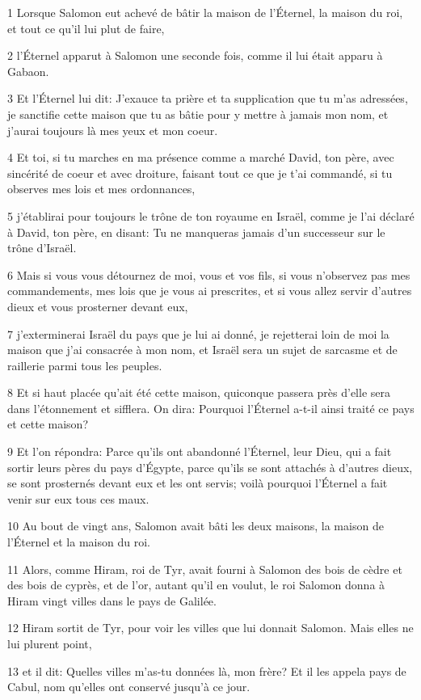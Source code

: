 \par 1 Lorsque Salomon eut achevé de bâtir la maison de l'Éternel, la maison du roi, et tout ce qu'il lui plut de faire,
\par 2 l'Éternel apparut à Salomon une seconde fois, comme il lui était apparu à Gabaon.
\par 3 Et l'Éternel lui dit: J'exauce ta prière et ta supplication que tu m'as adressées, je sanctifie cette maison que tu as bâtie pour y mettre à jamais mon nom, et j'aurai toujours là mes yeux et mon coeur.
\par 4 Et toi, si tu marches en ma présence comme a marché David, ton père, avec sincérité de coeur et avec droiture, faisant tout ce que je t'ai commandé, si tu observes mes lois et mes ordonnances,
\par 5 j'établirai pour toujours le trône de ton royaume en Israël, comme je l'ai déclaré à David, ton père, en disant: Tu ne manqueras jamais d'un successeur sur le trône d'Israël.
\par 6 Mais si vous vous détournez de moi, vous et vos fils, si vous n'observez pas mes commandements, mes lois que je vous ai prescrites, et si vous allez servir d'autres dieux et vous prosterner devant eux,
\par 7 j'exterminerai Israël du pays que je lui ai donné, je rejetterai loin de moi la maison que j'ai consacrée à mon nom, et Israël sera un sujet de sarcasme et de raillerie parmi tous les peuples.
\par 8 Et si haut placée qu'ait été cette maison, quiconque passera près d'elle sera dans l'étonnement et sifflera. On dira: Pourquoi l'Éternel a-t-il ainsi traité ce pays et cette maison?
\par 9 Et l'on répondra: Parce qu'ils ont abandonné l'Éternel, leur Dieu, qui a fait sortir leurs pères du pays d'Égypte, parce qu'ils se sont attachés à d'autres dieux, se sont prosternés devant eux et les ont servis; voilà pourquoi l'Éternel a fait venir sur eux tous ces maux.
\par 10 Au bout de vingt ans, Salomon avait bâti les deux maisons, la maison de l'Éternel et la maison du roi.
\par 11 Alors, comme Hiram, roi de Tyr, avait fourni à Salomon des bois de cèdre et des bois de cyprès, et de l'or, autant qu'il en voulut, le roi Salomon donna à Hiram vingt villes dans le pays de Galilée.
\par 12 Hiram sortit de Tyr, pour voir les villes que lui donnait Salomon. Mais elles ne lui plurent point,
\par 13 et il dit: Quelles villes m'as-tu données là, mon frère? Et il les appela pays de Cabul, nom qu'elles ont conservé jusqu'à ce jour.
